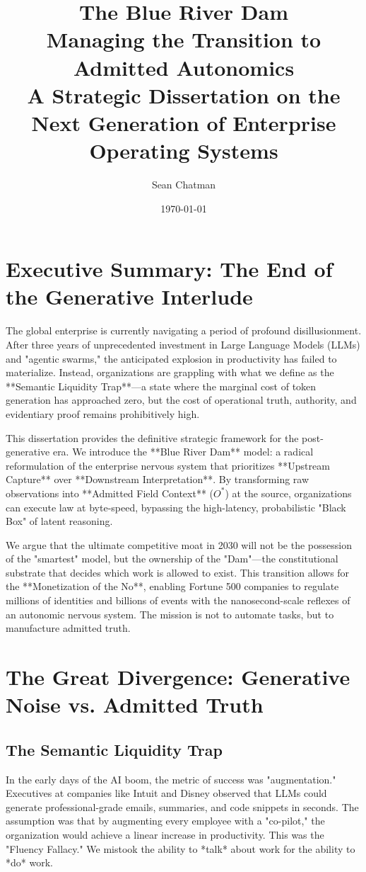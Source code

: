 \documentclass[12pt,a4paper,oneside]{book}
\title{\textbf{\huge \color{hbrblue}The Blue River Dam}\\\vspace{1em}\Large \color{hbrred}Managing the Transition to Admitted Autonomics\\\vspace{0.5em}A Strategic Dissertation on the Next Generation of Enterprise Operating Systems}
\author{Sean Chatman}
\date{\today}
\begin{document}
\maketitle

\chapter*{Executive Summary: The End of the Generative Interlude}
The global enterprise is currently navigating a period of profound disillusionment. After three years of unprecedented investment in Large Language Models (LLMs) and "agentic swarms," the anticipated explosion in productivity has failed to materialize. Instead, organizations are grappling with what we define as the **Semantic Liquidity Trap**---a state where the marginal cost of token generation has approached zero, but the cost of operational truth, authority, and evidentiary proof remains prohibitively high. 

This dissertation provides the definitive strategic framework for the post-generative era. We introduce the **Blue River Dam** model: a radical reformulation of the enterprise nervous system that prioritizes **Upstream Capture** over **Downstream Interpretation**. By transforming raw observations into **Admitted Field Context** ($O^*$) at the source, organizations can execute law at byte-speed, bypassing the high-latency, probabilistic "Black Box" of latent reasoning. 

We argue that the ultimate competitive moat in 2030 will not be the possession of the "smartest" model, but the ownership of the "Dam"---the constitutional substrate that decides which work is allowed to exist. This transition allows for the **Monetization of the No**, enabling Fortune 500 companies to regulate millions of identities and billions of events with the nanosecond-scale reflexes of an autonomic nervous system. The mission is not to automate tasks, but to manufacture admitted truth.

\tableofcontents

\chapter{The Great Divergence: Generative Noise vs. Admitted Truth}

\section{The Semantic Liquidity Trap}
In the early days of the AI boom, the metric of success was "augmentation." Executives at companies like Intuit and Disney observed that LLMs could generate professional-grade emails, summaries, and code snippets in seconds. The assumption was that by augmenting every employee with a "co-pilot," the organization would achieve a linear increase in productivity. This was the "Fluency Fallacy." We mistook the ability to *talk* about work for the ability to *do* work.
\end{document}
